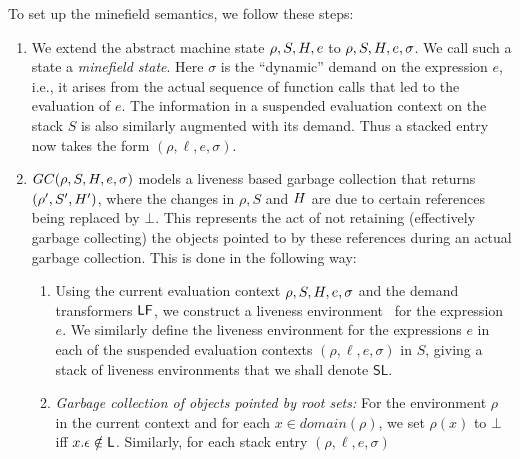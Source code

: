 \documentclass[preprint,9pt]{sigplanconf}
\newcommand{\stk}{{S}}
\begin{document}
To set up the minefield semantics, we follow these steps:
\begin{enumerate}

\item   We   extend    the   abstract   machine   state
  $\rho,S,H,e$   to  $\rho,S,H,e,\sigma$. 
We  call such a state  a \emph{minefield state}.
Here $\sigma$  is  the  ``dynamic'' demand  on  the  expression
  $e$, i.e., it arises
  from the  actual sequence of function  calls that led
  to  the evaluation  of  $e$.  %
  The  information in  a suspended
  evaluation  context  on  the   stack  $S$  is  also
  similarly augmented with its  demand.  Thus a stacked
  entry now takes  the form $(\rho, \ell,  e, \sigma)$.  %
\item  $GC(\rho,  S,  H,  e, \sigma)$ models  a  liveness  based  garbage
  collection that returns $(\rho', S', H')$, where the changes in
  $\rho, S$ and  $H$ are due
  to certain references being replaced by $\bot$.  This represents the
  act of  not retaining  (effectively garbage collecting)  the objects
  pointed to by these references  during an actual garbage collection.
  This is done in the following way:
  \begin{enumerate} 
  \item \label{gc-1}Using the current  evaluation context $\rho, \stk,
    \heap,   e,  \sigma$   and   the  demand   transformers
    $\mathsf{LF}$, we construct a liveness environment \Lv\ for the
    expression $e$.
 We  similarly  define  the  liveness  environment  for  the
 expressions $e$ in each of the suspended evaluation contexts $(\rho, \ell,  e, \sigma)$ in $S$, giving
 a stack of liveness environments that we shall denote $\mathsf{SL}$.
  \item \emph{Garbage collection of objects pointed by root sets:} For
    the environment $\rho$ in the current  context and for each $x \in
    domain(\rho)$, we  set $\rho(x)$ to $\bot$  iff $x.\epsilon \notin
    \mathsf{L}$.  Similarly,  for each  stack entry $(\rho,\ell,e,\sigma)$

\end{enumerate}
\end{enumerate}
\end{document}
